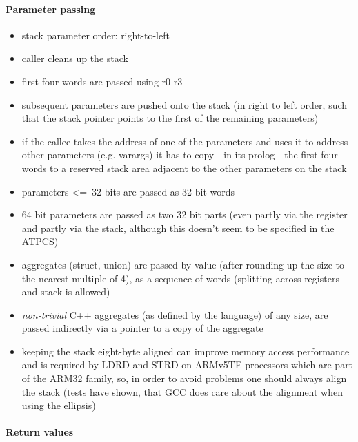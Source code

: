 \paragraph{Parameter passing}

\begin{itemize}
\item stack parameter order: right-to-left
\item caller cleans up the stack
\item first four words are passed using r0-r3
\item subsequent parameters are pushed onto the stack (in right to left order, such that the stack pointer points to the first of the remaining parameters)
\item if the callee takes the address of one of the parameters and uses it to address other parameters (e.g. varargs) it has to copy - in its prolog - the first four words to a reserved stack area adjacent to the other parameters on the stack
\item parameters \textless=\ 32 bits are passed as 32 bit words
\item 64 bit parameters are passed as two 32 bit parts (even partly via the register and partly via the stack, although this doesn't seem to be specified in the ATPCS)
\item aggregates (struct, union) are passed by value (after rounding up the size to the nearest multiple of 4), as a sequence of words (splitting across registers and stack is allowed)
\item {\it non-trivial} C++ aggregates (as defined by the language) of any size, are passed indirectly via a pointer to a copy of the aggregate
\item keeping the stack eight-byte aligned can improve memory access performance and is required by LDRD and STRD on ARMv5TE processors which are part of the ARM32 family, so, in order to avoid problems one should always align the stack (tests have shown, that GCC does care about the alignment when using the ellipsis)
\end{itemize}

\paragraph{Return values}


